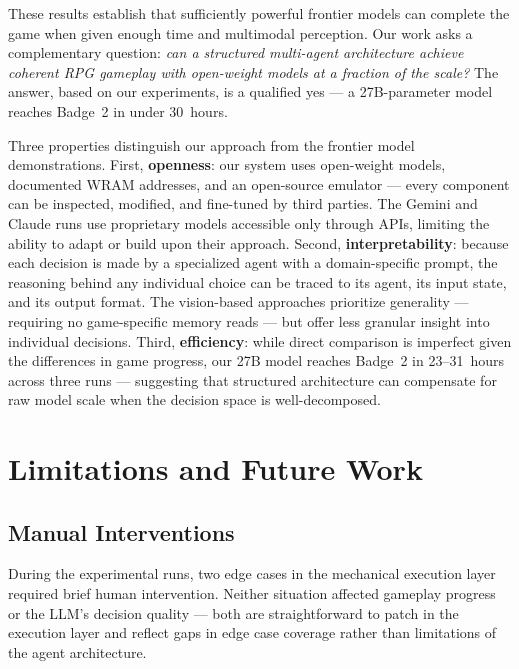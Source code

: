 \documentclass{article}
\begin{document}
These results establish that sufficiently powerful frontier models can complete the game when given enough time and multimodal perception. Our work asks a complementary question: \emph{can a structured multi-agent architecture achieve coherent RPG gameplay with open-weight models at a fraction of the scale?} The answer, based on our experiments, is a qualified yes --- a 27B-parameter model reaches Badge~2 in under 30~hours.

Three properties distinguish our approach from the frontier model demonstrations. First, \textbf{openness}: our system uses open-weight models, documented WRAM addresses, and an open-source emulator --- every component can be inspected, modified, and fine-tuned by third parties. The Gemini and Claude runs use proprietary models accessible only through APIs, limiting the ability to adapt or build upon their approach. Second, \textbf{interpretability}: because each decision is made by a specialized agent with a domain-specific prompt, the reasoning behind any individual choice can be traced to its agent, its input state, and its output format. The vision-based approaches prioritize generality --- requiring no game-specific memory reads --- but offer less granular insight into individual decisions. Third, \textbf{efficiency}: while direct comparison is imperfect given the differences in game progress, our 27B model reaches Badge~2 in 23--31~hours across three runs --- suggesting that structured architecture can compensate for raw model scale when the decision space is well-decomposed.


\section{Limitations and Future Work}
\label{sec:limitations}

\subsection{Manual Interventions}

During the experimental runs, two edge cases in the mechanical execution layer required brief human intervention. Neither situation affected gameplay progress or the LLM's decision quality --- both are straightforward to patch in the execution layer and reflect gaps in edge case coverage rather than limitations of the agent architecture.
\end{document}
